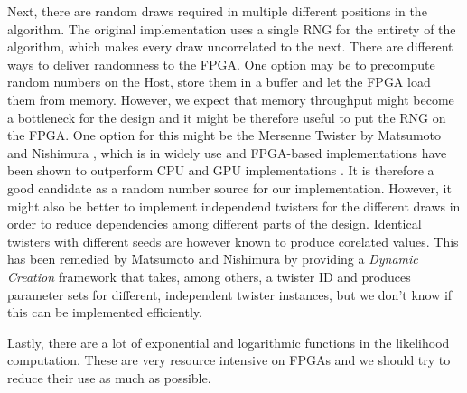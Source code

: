 Next, there are random draws required in multiple different positions in the algorithm. The original implementation uses a single \ac{RNG} for the entirety of the algorithm, which makes every draw uncorrelated to the next. There are different ways to deliver randomness to the \ac{FPGA}. One option may be to precompute random numbers on the Host, store them in a buffer and let the FPGA load them from memory. However, we expect that memory throughput might become a bottleneck for the design and it might be therefore useful to put the \ac{RNG} on the \ac{FPGA}. One option for this might be the Mersenne Twister by Matsumoto and Nishimura \cite{matsumoto1998mersenne}, which is in widely use and \ac{FPGA}-based implementations have been shown to outperform CPU and GPU implementations \cite{tian2009mersenne}. It is therefore a good candidate as a random number source for our implementation. However, it might also be better to implement independend twisters for the different draws in order to reduce dependencies among different parts of the design. Identical twisters with different seeds are however known to produce corelated values. This has been remedied by Matsumoto and Nishimura by providing a \textit{Dynamic Creation} framework \cite{matsumoto2000dynamic} that takes, among others, a twister ID and produces parameter sets for different, independent twister instances, but we don't know if this can be implemented efficiently.

Lastly, there are a lot of exponential and logarithmic functions in the likelihood computation. These are very resource intensive on \acp{FPGA} and we should try to reduce their use as much as possible.
